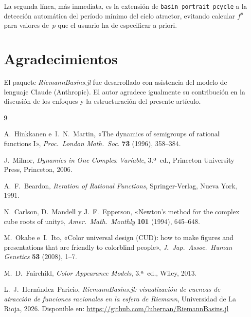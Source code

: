 \documentclass[11pt,a4paper]{article}
\theoremstyle{plain}
\theoremstyle{definition}
\theoremstyle{remark}
\newcommand{\fn}[1]{\texttt{#1}}
\newcommand{\pkg}[1]{\textsl{#1}}
\begin{document}
La segunda línea, más inmediata, es la extensión de
\fn{basin\_portrait\_pcycle} a la detección automática del período
mínimo del ciclo atractor, evitando calcular $f^p$ para valores de~$p$
que el usuario ha de especificar a priori.

\section*{Agradecimientos}

El paquete \pkg{RiemannBasins.jl} fue desarrollado con asistencia del
modelo de lenguaje Claude (Anthropic).
El autor agradece igualmente su contribución en la discusión de los
enfoques y la estructuración del presente artículo.

\begin{thebibliography}{9}

A.~Hinkkanen e~I.~N.~Martin,
«The dynamics of semigroups of rational functions I»,
\textit{Proc.\ London Math.\ Soc.} \textbf{73} (1996), 358--384.

J.~Milnor,
\textit{Dynamics in One Complex Variable},
3.ª~ed., Princeton University Press, Princeton, 2006.

A.~F.~Beardon,
\textit{Iteration of Rational Functions},
Springer-Verlag, Nueva York, 1991.

N.~Carlson, D.~Mandell y J.~F.~Epperson,
«Newton's method for the complex cube roots of unity»,
\textit{Amer.\ Math.\ Monthly} \textbf{101} (1994), 645--648.

M.~Okabe e~I.~Ito,
«Color universal design (CUD): how to make figures and presentations
that are friendly to colorblind people»,
\textit{J.\ Jap.\ Assoc.\ Human Genetics} \textbf{53} (2008), 1--7.

M.~D.~Fairchild,
\textit{Color Appearance Models},
3.ª~ed., Wiley, 2013.

L.~J.~Hernández~Paricio,
\textit{RiemannBasins.jl: visualización de cuencas de atracción de
funciones racionales en la esfera de Riemann},
Universidad de La Rioja, 2026.
Disponible en: \url{https://github.com/luhernan/RiemannBasins.jl}

\end{thebibliography}
\end{document}
